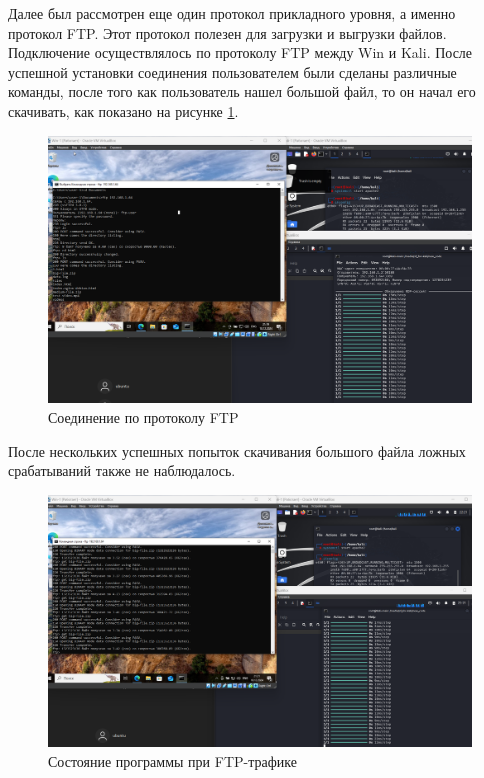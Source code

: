 \documentclass[spec, och, diploma]{SCWorks}
\begin{document}
Далее был рассмотрен еще один протокол прикладного уровня, а именно протокол FTP. Этот протокол полезен для загрузки и выгрузки файлов. Подключение осуществлялось 
по протоколу FTP между Win и Kali. После успешной установки соединения пользователем были сделаны различные команды, 
после того как пользователь нашел большой файл, то
он начал его скачивать, как показано на рисунке \ref{ftp1}.

\begin{figure}[H]
  \centering
  \includegraphics[width=1.0\textwidth]{pics/new3.png}
  \caption{Соединение по протоколу FTP}
  \label{ftp1}
\end{figure}

После нескольких успешных попыток скачивания большого файла ложных срабатываний также не наблюдалось.


\begin{figure}[H]
  \centering
  \includegraphics[width=1.0\textwidth]{pics/new4.png}
  \caption{Состояние программы при FTP-трафике}
  \label{ftp2}
\end{figure}
\end{document}
